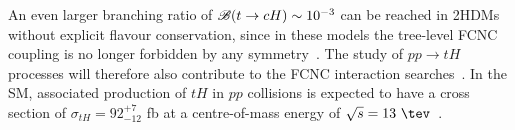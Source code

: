 An even larger branching ratio of  $\mathscr{B}(t\to cH) \sim 10^{-3}$ can be reached in 2HDMs without explicit flavour conservation, since in these models the tree-level FCNC coupling is no longer forbidden by any symmetry~\cite{Cheng:1987rs,Baum:2008qm,Chen:2013qta,Chiang:2015cba,Crivellin:2015hha,Botella:2015hoa, Gori:2017tvg,Chiang:2017fjr}. 
The study of $pp\rightarrow tH$ processes will therefore also contribute to the FCNC interaction searches~\cite{Greljo:2014dka}.
In the SM, associated production of $tH$ in $pp$ collisions is expected to have a cross section of $\sigma_{tH}=92^{+7}_{-12}$ fb at a centre-of-mass energy of $\sqrt{s}= 13~\tev$~\cite{deFlorian:2016spz}.

